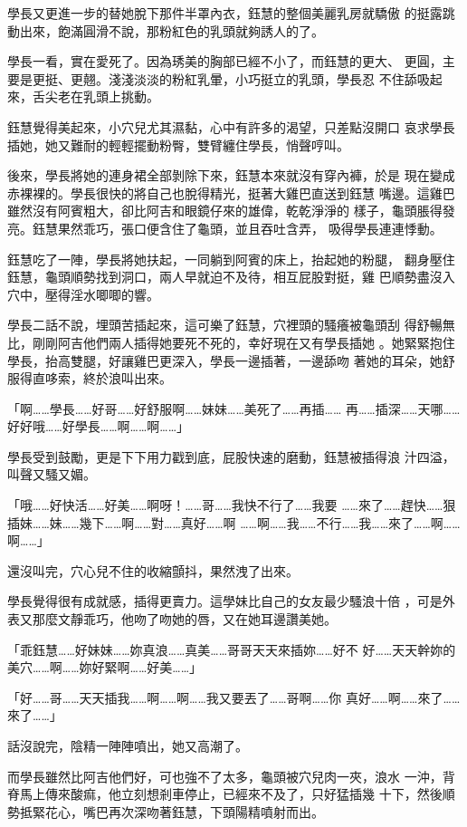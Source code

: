 學長又更進一步的替她脫下那件半罩內衣，鈺慧的整個美麗乳房就驕傲
的挺露跳動出來，飽滿圓滑不說，那粉紅色的乳頭就夠誘人的了。

學長一看，實在愛死了。因為琇美的胸部已經不小了，而鈺慧的更大、
更圓，主要是更挺、更翹。淺淺淡淡的粉紅乳暈，小巧挺立的乳頭，學長忍
不住舔吸起來，舌尖老在乳頭上挑動。

鈺慧覺得美起來，小穴兒尤其濕黏，心中有許多的渴望，只差點沒開口
哀求學長插她，她又難耐的輕輕擺動粉臀，雙臂纏住學長，悄聲哼叫。

後來，學長將她的連身裙全部剝除下來，鈺慧本來就沒有穿內褲，於是
現在變成赤裸裸的。學長很快的將自己也脫得精光，挺著大雞巴直送到鈺慧
嘴邊。這雞巴雖然沒有阿賓粗大，卻比阿吉和眼鏡仔來的雄偉，乾乾淨淨的
樣子，龜頭脹得發亮。鈺慧果然乖巧，張口便含住了龜頭，並且吞吐含弄，
吸得學長連連悸動。

鈺慧吃了一陣，學長將她扶起，一同躺到阿賓的床上，抬起她的粉腿，
翻身壓住鈺慧，龜頭順勢找到洞口，兩人早就迫不及待，相互屁股對挺，雞
巴順勢盡沒入穴中，壓得淫水唧唧的響。

學長二話不說，埋頭苦插起來，這可樂了鈺慧，穴裡頭的騷癢被龜頭刮
得舒暢無比，剛剛阿吉他們兩人插得她要死不死的，幸好現在又有學長插她
。她緊緊抱住學長，抬高雙腿，好讓雞巴更深入，學長一邊插著，一邊舔吻
著她的耳朵，她舒服得直哆索，終於浪叫出來。

「啊……學長……好哥……好舒服啊……妹妹……美死了……再插……
再……插深……天哪……好好哦……好學長……啊……啊……」

學長受到鼓勵，更是下下用力戳到底，屁股快速的磨動，鈺慧被插得浪
汁四溢，叫聲又騷又媚。

「哦……好快活……好美……啊呀！……哥……我快不行了……我要
……來了……趕快……狠插妹……妹……幾下……啊……對……真好……啊
……啊……我……不行……我……來了……啊……啊……」

還沒叫完，穴心兒不住的收縮顫抖，果然洩了出來。

學長覺得很有成就感，插得更賣力。這學妹比自己的女友最少騷浪十倍
，可是外表又那麼文靜乖巧，他吻了吻她的唇，又在她耳邊讚美她。

「乖鈺慧……好妹妹……妳真浪……真美……哥哥天天來插妳……好不
好……天天幹妳的美穴……啊……妳好緊啊……好美……」

「好……哥……天天插我……啊……啊……我又要丟了……哥啊……你
真好……啊……來了……來了……」

話沒說完，陰精一陣陣噴出，她又高潮了。

而學長雖然比阿吉他們好，可也強不了太多，龜頭被穴兒肉一夾，浪水
一沖，背脊馬上傳來酸痲，他立刻想剎車停止，已經來不及了，只好猛插幾
十下，然後順勢抵緊花心，嘴巴再次深吻著鈺慧，下頭陽精噴射而出。

